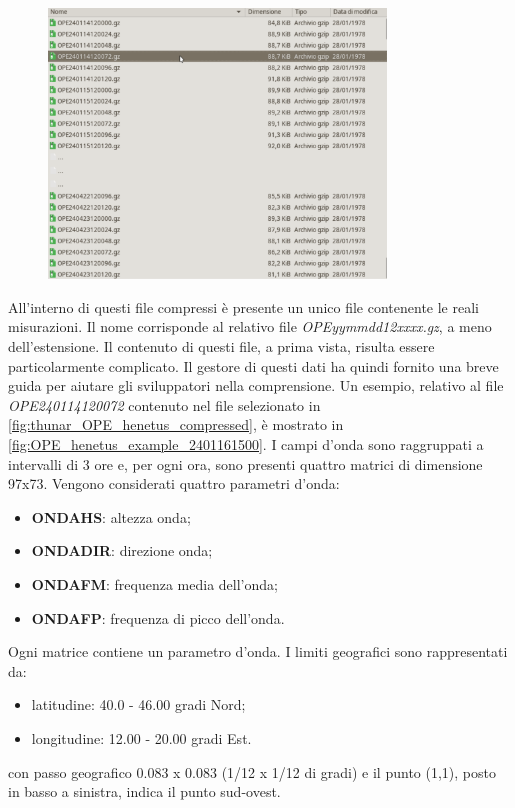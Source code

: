 \documentclass[./main.tex]{subfiles}
\begin{document}
\begin{figure}[!ht]
\noindent \begin{minipage}{\textwidth}
\vspace{1cm}
\centering
\includegraphics[width=0.8\textwidth]{images/thunar_OPE_henetus_compressed.pdf}
\captionsetup{font=small, hypcap=false}
\label{fig:thunar_OPE_henetus_compressed}
\end{minipage}
\vspace{0.25cm}
\end{figure}

All'interno di questi file compressi è presente un unico file contenente le reali misurazioni. Il nome corrisponde al relativo file \textit{OPEyymmdd12xxxx.gz}, a meno dell'estensione. Il contenuto di questi file, a prima vista, risulta essere particolarmente complicato. Il gestore di questi dati ha quindi fornito una breve guida per aiutare gli sviluppatori nella comprensione. Un esempio, relativo al file \textit{OPE240114120072} contenuto nel file selezionato in \autoref{fig:thunar_OPE_henetus_compressed}, è mostrato in \autoref{fig:OPE_henetus_example_2401161500}. I campi d'onda sono raggruppati a intervalli di 3 ore e, per ogni ora, sono presenti quattro matrici di dimensione 97x73. Vengono considerati quattro parametri d'onda:
\begin{itemize}
    \item \textbf{ONDAHS}: altezza onda;
    \item \textbf{ONDADIR}: direzione onda;
    \item \textbf{ONDAFM}: frequenza media dell'onda;
    \item \textbf{ONDAFP}: frequenza di picco dell'onda.
\end{itemize}
Ogni matrice contiene un parametro d'onda. I limiti geografici sono rappresentati da:
\begin{itemize}
    \item latitudine: 40.0 - 46.00  gradi Nord;
    \item longitudine:  12.00 - 20.00  gradi Est.
\end{itemize}
con passo geografico 0.083 x 0.083  (1/12 x 1/12 di gradi) e il punto (1,1), posto in basso a sinistra, indica il punto sud-ovest.
\end{document}
